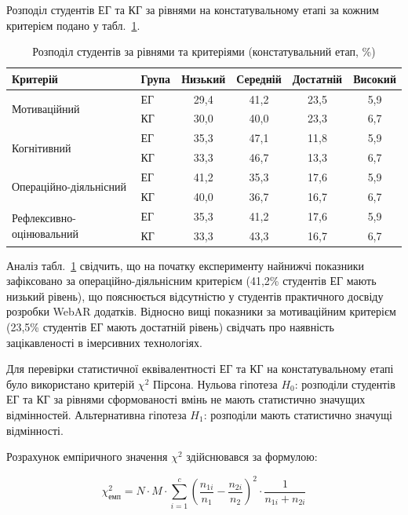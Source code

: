 Розподіл студентів ЕГ та КГ за рівнями на констатувальному етапі за кожним критерієм подано у табл.~\ref{tab:konst_detail}.

\begin{table}[!h]
\caption{Розподіл студентів за рівнями та критеріями (констатувальний етап, \%)}
\label{tab:konst_detail}
\centering
\small
\begin{tabular}{|l|l|c|c|c|c|}
\hline
\textbf{Критерій} & \textbf{Група} & \textbf{Низький} & \textbf{Середній} & \textbf{Достатній} & \textbf{Високий} \\
\hline
\multirow{2}{*}{Мотиваційний} & ЕГ & 29,4 & 41,2 & 23,5 & 5,9 \\
\cline{2-6}
 & КГ & 30,0 & 40,0 & 23,3 & 6,7 \\
\hline
\multirow{2}{*}{Когнітивний} & ЕГ & 35,3 & 47,1 & 11,8 & 5,9 \\
\cline{2-6}
 & КГ & 33,3 & 46,7 & 13,3 & 6,7 \\
\hline
\multirow{2}{*}{Операційно-діяльнісний} & ЕГ & 41,2 & 35,3 & 17,6 & 5,9 \\
\cline{2-6}
 & КГ & 40,0 & 36,7 & 16,7 & 6,7 \\
\hline
\multirow{2}{*}{Рефлексивно-оцінювальний} & ЕГ & 35,3 & 41,2 & 17,6 & 5,9 \\
\cline{2-6}
 & КГ & 33,3 & 43,3 & 16,7 & 6,7 \\
\hline
\end{tabular}
\end{table}

Аналіз табл.~\ref{tab:konst_detail} свідчить, що на початку експерименту найнижчі показники зафіксовано за операційно-діяльнісним критерієм (41,2\% студентів ЕГ мають низький рівень), що пояснюється відсутністю у студентів практичного досвіду розробки WebAR додатків. Відносно вищі показники за мотиваційним критерієм (23,5\% студентів ЕГ мають достатній рівень) свідчать про наявність зацікавленості в імерсивних технологіях.

Для перевірки статистичної еквівалентності ЕГ та КГ на констатувальному етапі було використано критерій $\chi^2$ Пірсона. Нульова гіпотеза $H_0$: розподіли студентів ЕГ та КГ за рівнями сформованості вмінь не мають статистично значущих відмінностей. Альтернативна гіпотеза $H_1$: розподіли мають статистично значущі відмінності.

Розрахунок емпіричного значення $\chi^2$ здійснювався за формулою:

\begin{equation}
\chi^2_{\text{емп}} = N \cdot M \cdot \sum_{i=1}^{c} \left( \frac{n_{1i}}{n_1} - \frac{n_{2i}}{n_2} \right)^2 \cdot \frac{1}{n_{1i} + n_{2i}}
\label{eq:chi2}
\end{equation}

